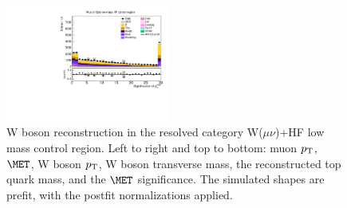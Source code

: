 \begin{figure}[tbp]
\begin{center}
    \includegraphics[width=0.48\textwidth]{figures/wlnhbb2016/resolved/WmnWHHeavyFlavorCRLowMass_pfmetsig.pdf}
    \caption{W boson reconstruction in the resolved category W($\mu\nu$)+HF low mass control region.
    Left to right and top to bottom: muon $p_{\mathrm{T}}$, $\MET$, W boson $p_{\mathrm{T}}$, W boson transverse mass,
    the reconstructed top quark mass, and the $\MET$ significance.
    The simulated shapes are prefit, with the postfit normalizations applied.}
    \label{fig:res_WmnHFLowMass_WBosons}
  \end{center}
\end{figure}
\clearpage

